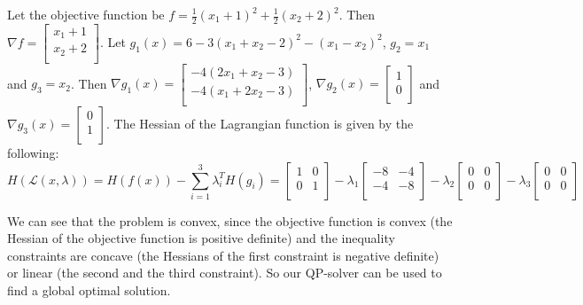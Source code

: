 \documentclass{article}
\begin{document}
Let the objective function be $f =  \frac{1}{2}(x_1+1)^2+\frac{1}{2}(x_2+2)^2 $. Then $\nabla f = \begin{bmatrix} x_1+1\\ x_2+2 \\ \end{bmatrix}$. Let $g_1(x) = 6-3(x_1+x_2-2)^2-(x_1-x_2)^2 $, $g_2 = x_1$ and $g_3 = x_2$. Then $\nabla g_1(x) = \begin{bmatrix} -4(2x_1+x_2-3) \\  -4(x_1+2x_2-3) \\ \end{bmatrix}$, $\nabla g_2(x) = \begin{bmatrix} 1 \\ 0 \\ \end{bmatrix}$ and $\nabla g_3(x) = \begin{bmatrix} 0 \\ 1 \\ \end{bmatrix}$. The Hessian of the Lagrangian function is given by the following: 
\begin{equation*}
    H(\mathcal{L}(x, \lambda)) = H(f(x)) - \sum_{i=1}^3 \lambda_i^T H(g_i) = \begin{bmatrix} 1 &  0\\ 0 & 1 \\ \end{bmatrix} - \lambda_1 \begin{bmatrix} -8 & -4\\ -4 & -8 \\ \end{bmatrix} - \lambda_2 \begin{bmatrix} 0 & 0\\ 0 & 0 \\ \end{bmatrix} - \lambda_3 \begin{bmatrix} 0 & 0\\ 0 & 0 \\ \end{bmatrix}
\end{equation*}

We can see that the problem is convex, since the objective function is convex (the Hessian of the objective function is positive definite) and the inequality constraints are concave (the Hessians of the first constraint is negative definite) or linear (the second and the third constraint). So our QP-solver can be used to find a global optimal solution.
\end{document}
